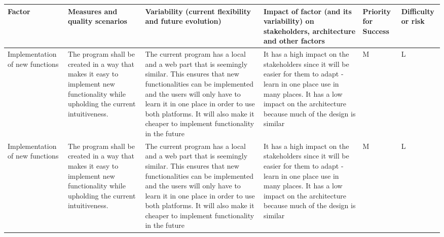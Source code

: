 \documentclass[a4paper,11pt,report]{report}
\begin{document}
\begin{landscape}
\begin{table}
\small
\begin{center}
    \begin{tabular}{| p{3.3cm} | p{3.3cm} | p{3.3cm} | p{3.3cm} | p{3.3cm} | p{3.3cm} |}
    \hline
    Factor & Measures and quality scenarios & Variability (current flexibility and future evolution) & Impact of factor (and its variability) on stakeholders, architecture and other factors &  Priority for Success & Difficulty or risk\\ \hline
 Implementation of new functions & The program shall be created in a way that makes it easy to implement new functionality while upholding the current intuitiveness.  & The current program has a local and a web part that is seemingly similar. This ensures that new functionalities can be implemented and the users will only have to learn it in one place  in order to use both platforms. It will also make it cheaper to implement functionality in the future & It has a high impact on the stakeholders since it will be easier for them to adapt - learn in one place use in many places. It has a low impact on the architecture because much of the design is similar & M & L 
\\ \hline
        Implementation of new functions & The program shall be created in a way that makes it easy to implement new functionality while upholding the current intuitiveness.  & The current program has a local and a web part that is seemingly similar. This ensures that new functionalities can be implemented and the users will only have to learn it in one place  in order to use both platforms. It will also make it cheaper to implement functionality in the future & It has a high impact on the stakeholders since it will be easier for them to adapt - learn in one place use in many places. It has a low impact on the architecture because much of the design is similar & M & L 
        \\ \hline
        \end{tabular}
\end{center}
\end{table}
\end{landscape}
\end{document}
